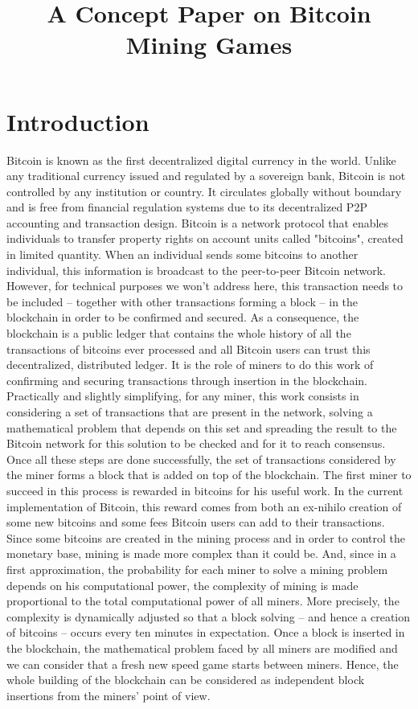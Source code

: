 \documentclass{article}
\begin{document}
\title{A Concept Paper on Bitcoin Mining Games}
\maketitle


\section{Introduction}
Bitcoin is known as the first decentralized digital currency in the world. Unlike any traditional currency issued and regulated by a sovereign bank, Bitcoin is not controlled by any institution or country. It circulates globally without boundary and is free from financial regulation systems due to its decentralized P2P accounting and transaction design. Bitcoin is a network protocol that enables individuals to transfer property rights on account units called "bitcoins", created in limited quantity. When an individual sends some bitcoins to another individual, this information is broadcast to the peer-to-peer Bitcoin network. However, for technical purposes we won’t address here, this transaction needs to be included – together with other transactions forming a block – in the blockchain in order to be confirmed and secured. As a consequence, the blockchain is a public ledger that contains the whole history of all the transactions of bitcoins ever processed and all Bitcoin users can trust this decentralized, distributed ledger.
It is the role of miners to do this work of confirming and securing transactions through insertion in the blockchain. Practically and slightly simplifying, for any miner, this work consists in considering a set of transactions that are present in the network, solving a mathematical problem that depends on this set and spreading the result to the Bitcoin network for this solution to be checked and for it to reach consensus. Once all these steps are done successfully, the set of transactions considered by the miner forms a block that is added on top of the blockchain. The first miner to succeed in this process is rewarded in bitcoins for his useful work.
In the current implementation of Bitcoin, this reward comes from both an ex-nihilo creation of some new bitcoins and some fees Bitcoin users can add to their transactions. Since some bitcoins are created in the mining process and in order to control the monetary base, mining is made more complex than it could be. And, since in a first approximation, the probability for each miner to solve a mining problem depends on his computational power, the complexity of mining is made proportional to the total computational power of all miners. More precisely, the complexity is dynamically adjusted so that a block solving – and hence a creation of bitcoins – occurs every ten minutes in expectation. Once a block is inserted in the blockchain, the mathematical problem faced by all miners are modified and we can consider that a fresh new speed game starts between miners. Hence, the whole building of the blockchain can be considered as independent block insertions from the miners’ point of view.
\end{document}
